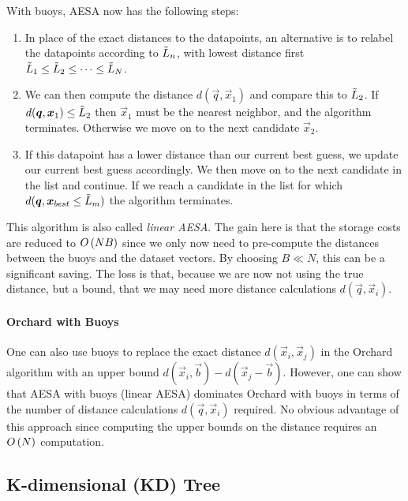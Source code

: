 With buoys, AESA now has the following steps:
\begin{enumerate}
	\item In place of the exact distances to the datapoints, an alternative is to relabel the datapoints according to $\tilde{L}_n$, with lowest distance first $\tilde{L}_1\leq\tilde{L}_2\leq\cdots\leq\tilde{L}_N$.
	\item We can then compute the distance $d(\vec{q},\vec{x}_1)$ and compare this to $\tilde{L}_2$. If $d(\boldsymbol{q},\boldsymbol{x}_1)\leq\tilde{L}_2$ then $\vec{x}_1$ must be the nearest neighbor, and the algorithm terminates. Otherwise we move on to the next candidate $\vec{x}_2$.
	\item If this datapoint has a lower distance than our current best guess, we update our current best guess accordingly. We then move on to the next candidate in the list and continue. If we reach a candidate in the list for which $d(\boldsymbol{q},\boldsymbol{x}_{best}\leq\tilde{L}_m)$ the algorithm terminates.
\end{enumerate}
This algorithm is also called \emph{linear AESA}. The gain here is that the storage costs are reduced to $O\left(NB\right)$ since we only now need to pre-compute the distances between the buoys and the dataset vectors. By choosing $B\ll N$, this can be a significant saving. The loss is that, because we are now not using the true distance, but a bound, that we may need more distance calculations $d(\vec{q},\vec{x}_i)$.

\paragraph{Orchard with Buoys}

One can also use buoys to replace the exact distance $d(\vec{x}_i,\vec{x}_j)$ in the Orchard algorithm with an upper bound $d(\vec{x}_i,\vec{b})-d(\vec{x}_j-\vec{b})$. However, one can show that AESA with buoys (linear AESA) dominates Orchard with buoys in terms of the number of distance calculations $d(\vec{q},\vec{x}_i)$ required. No obvious advantage of this approach since computing the upper bounds on the distance requires an $O\left(N\right)$ computation.

\subsection{K-dimensional (KD) Tree}


